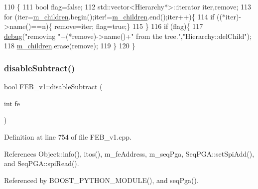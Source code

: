 \begin{DoxyCode}
110                                    \{
111   \textcolor{keywordtype}{bool} flag=\textcolor{keyword}{false};
112   std::vector<Hierarchy*>::iterator iter,\textcolor{keyword}{remove};
113   \textcolor{keywordflow}{for} (iter=\hyperlink{classHierarchy_a038816763941fd4a930504917f60483b}{m\_children}.begin();iter!=\hyperlink{classHierarchy_a038816763941fd4a930504917f60483b}{m\_children}.end();iter++)\{
114     \textcolor{keywordflow}{if} ((*iter)->name()==n)\{ \textcolor{keyword}{remove}=iter; flag=\textcolor{keyword}{true};\}
115   \}
116   \textcolor{keywordflow}{if} (flag)\{
117     \hyperlink{classObject_aac010553f022165573714b7014a15f0d}{debug}(\textcolor{stringliteral}{"removing "}+(*remove)->name()+\textcolor{stringliteral}{" from the tree."},\textcolor{stringliteral}{"Hierarchy::delChild"});
118     \hyperlink{classHierarchy_a038816763941fd4a930504917f60483b}{m\_children}.erase(\textcolor{keyword}{remove});
119   \}
120 \}
\end{DoxyCode}
\mbox{\label{classFEB__v1_a3d224acca0807603d14b72cff6359b3f}} 
\subsubsection{\texorpdfstring{disable\+Subtract()}{disableSubtract()}}
{\footnotesize\ttfamily bool F\+E\+B\+\_\+v1\+::disable\+Subtract (\begin{DoxyParamCaption}\item[{int}]{fe }\end{DoxyParamCaption})}



Definition at line 754 of file F\+E\+B\+\_\+v1.\+cpp.



References Object\+::info(), itos(), m\+\_\+fe\+Address, m\+\_\+seq\+Pga, Seq\+P\+G\+A\+::set\+Spi\+Add(), and Seq\+P\+G\+A\+::spi\+Read().



Referenced by B\+O\+O\+S\+T\+\_\+\+P\+Y\+T\+H\+O\+N\+\_\+\+M\+O\+D\+U\+L\+E(), and seq\+Pga().


